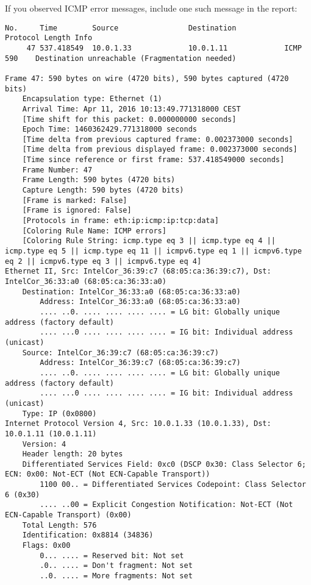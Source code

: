 If you observed ICMP error messages, include one such message in the report:

\begin{lstlisting}
No.     Time        Source                Destination           Protocol Length Info
     47 537.418549  10.0.1.33             10.0.1.11             ICMP     590    Destination unreachable (Fragmentation needed)

Frame 47: 590 bytes on wire (4720 bits), 590 bytes captured (4720 bits)
    Encapsulation type: Ethernet (1)
    Arrival Time: Apr 11, 2016 10:13:49.771318000 CEST
    [Time shift for this packet: 0.000000000 seconds]
    Epoch Time: 1460362429.771318000 seconds
    [Time delta from previous captured frame: 0.002373000 seconds]
    [Time delta from previous displayed frame: 0.002373000 seconds]
    [Time since reference or first frame: 537.418549000 seconds]
    Frame Number: 47
    Frame Length: 590 bytes (4720 bits)
    Capture Length: 590 bytes (4720 bits)
    [Frame is marked: False]
    [Frame is ignored: False]
    [Protocols in frame: eth:ip:icmp:ip:tcp:data]
    [Coloring Rule Name: ICMP errors]
    [Coloring Rule String: icmp.type eq 3 || icmp.type eq 4 || icmp.type eq 5 || icmp.type eq 11 || icmpv6.type eq 1 || icmpv6.type eq 2 || icmpv6.type eq 3 || icmpv6.type eq 4]
Ethernet II, Src: IntelCor_36:39:c7 (68:05:ca:36:39:c7), Dst: IntelCor_36:33:a0 (68:05:ca:36:33:a0)
    Destination: IntelCor_36:33:a0 (68:05:ca:36:33:a0)
        Address: IntelCor_36:33:a0 (68:05:ca:36:33:a0)
        .... ..0. .... .... .... .... = LG bit: Globally unique address (factory default)
        .... ...0 .... .... .... .... = IG bit: Individual address (unicast)
    Source: IntelCor_36:39:c7 (68:05:ca:36:39:c7)
        Address: IntelCor_36:39:c7 (68:05:ca:36:39:c7)
        .... ..0. .... .... .... .... = LG bit: Globally unique address (factory default)
        .... ...0 .... .... .... .... = IG bit: Individual address (unicast)
    Type: IP (0x0800)
Internet Protocol Version 4, Src: 10.0.1.33 (10.0.1.33), Dst: 10.0.1.11 (10.0.1.11)
    Version: 4
    Header length: 20 bytes
    Differentiated Services Field: 0xc0 (DSCP 0x30: Class Selector 6; ECN: 0x00: Not-ECT (Not ECN-Capable Transport))
        1100 00.. = Differentiated Services Codepoint: Class Selector 6 (0x30)
        .... ..00 = Explicit Congestion Notification: Not-ECT (Not ECN-Capable Transport) (0x00)
    Total Length: 576
    Identification: 0x8814 (34836)
    Flags: 0x00
        0... .... = Reserved bit: Not set
        .0.. .... = Don't fragment: Not set
        ..0. .... = More fragments: Not set

\end{lstlisting}
